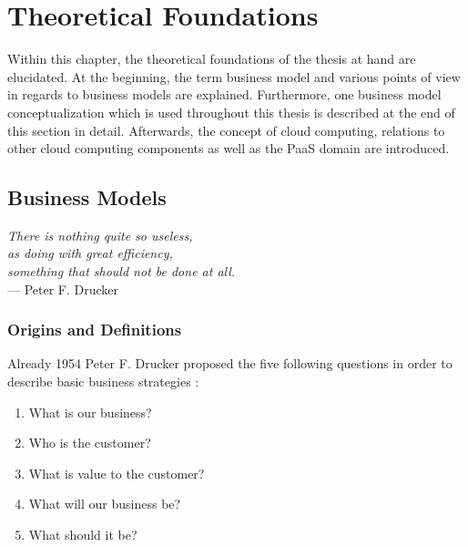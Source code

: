 \chapter{Theoretical Foundations}\label{ch:tf}


Within this chapter, the theoretical foundations of the thesis at hand are elucidated. At the beginning, the term business model and various points of view in regards to business models are explained. Furthermore, one business model conceptualization which is used throughout this thesis is described at the end of this section in detail. Afterwards, the concept of cloud computing, relations to other cloud computing components as well as the \ac{PaaS} domain are introduced.

\section{Business Models}\label{ch:tf:bm}

\begin{flushright}{\slshape    
	There is nothing quite so useless,\\
	as doing with great efficiency, \\
	something that should not be done at all.} \\ \medskip
	--- Peter F. Drucker
\end{flushright}

\subsection{Origins and Definitions}

Already 1954 Peter F. Drucker proposed the five following questions in order to describe basic business strategies \citep[pp. 49-61]{Drucker1954}:

\begin{enumerate}[parsep=0pt, topsep=0pt, itemsep=0pt]
	\item What is our business?
	\item Who is the customer?
	\item What is value to the customer?
	\item What will our business be?
	\item What should it be?
\end{enumerate}

